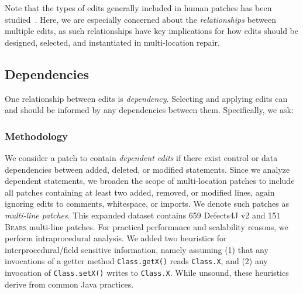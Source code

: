 \documentclass[10pt,journal,compsoc]{IEEEtran}
\newcommand\bears{\textsc{Bears}\xspace}
\begin{document}
Note that the types of edits generally included in human patches has been
studied~\cite{zhong2015,soto}.  Here, we are especially
concerned about the 
\emph{relationships} between multiple edits, as such relationships have
key implications for how edits should be designed, selected, and instantiated 
in multi-location repair. 

\subsection{Dependencies}

One relationship between edits is
\emph{dependency}. Selecting and applying edits can
and should be informed by any dependencies between them.  Specifically, we ask:


\subsubsection{Methodology}
We consider a patch to contain \emph{dependent edits} if there exist 
control or data dependencies between added, deleted, or modified statements.
Since we analyze dependent statements, we broaden the scope of multi-location patches to 
include all patches containing at least two added, removed, or modified lines, 
again ignoring edits to comments, whitespace, or imports.
We denote such patches as \emph{multi-line patches}.
This expanded dataset contains 659 Defects4J v2 and 151 \bears 
multi-line patches.
For practical performance and scalability reasons, 
we perform intraprocedural analysis. We added two heuristics for
interprocedural/field sensitive
information, namely assuming (1) that any invocations of a getter
method  \texttt{Class.getX()} reads \texttt{Class.X}, and (2) any invocation of 
 \texttt{Class.setX()} writes to  \texttt{Class.X}.
%
While unsound, these heuristics derive from common Java
practices.
\end{document}
